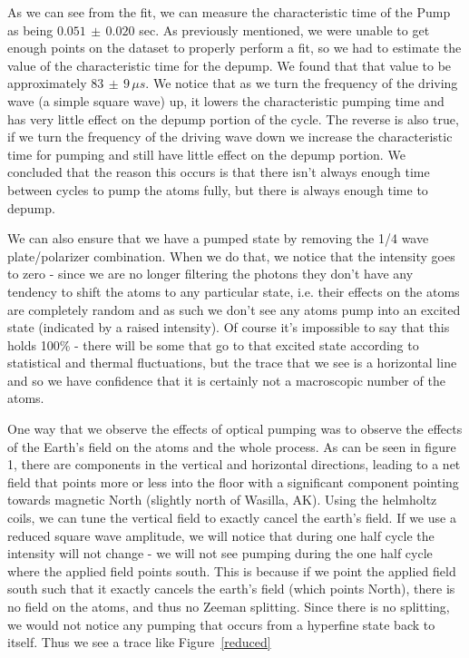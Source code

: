 \documentclass{article}
\begin{document}
    As we can see from the fit, we can measure the characteristic time of the Pump as being $0.051 \, \pm \, 0.020$ sec.  As previously mentioned, we were unable to get enough points on the dataset to properly perform a fit, so we had to estimate the value of the characteristic time for the depump.  We found that that value to be approximately $83 \, \pm \, 9 \, \mu s$.  We notice that as we turn the frequency of the driving wave (a simple square wave) up, it lowers the characteristic pumping time and has very little effect on the depump portion of the cycle.  The reverse is also true, if we turn the frequency of the driving wave down we increase the characteristic time for pumping and still have little effect on the depump portion.  We concluded that the reason this occurs is that there isn't always enough time between cycles to pump the atoms fully, but there is always enough time to depump.

    \hspace{.25cm}

    We can also ensure that we have a pumped state by removing the 1/4 wave plate/polarizer combination.  When we do that, we notice that the intensity goes to zero - since we are no longer filtering the photons they don't have any tendency to shift the atoms to any particular state, i.e. their effects on the atoms are completely random and as such we don't see any atoms pump into an excited state (indicated by a raised intensity).  Of course it's impossible to say that this holds 100\% - there will be some that go to that excited state according to statistical and thermal fluctuations, but the trace that we see is a horizontal line and so we have confidence that it is certainly not a macroscopic number of the atoms.

    \hspace{.25cm}

    One way that we observe the effects of optical pumping was to observe the effects of the Earth's field on the atoms and the whole process.  As can be seen in figure 1, there are components in the vertical and horizontal directions, leading to a net field that points more or less into the floor with a significant component pointing towards magnetic North (slightly north of Wasilla, AK).  Using the helmholtz coils, we can tune the vertical field to exactly cancel the earth's field.  If we use a reduced square wave amplitude, we will notice that during one half cycle the intensity will not change - we will not see pumping during the one half cycle where the applied field points south.  This is because if we point the applied field south such that it exactly cancels the earth's field (which points North), there is no field on the atoms, and thus no Zeeman splitting.  Since there is no splitting, we would not notice any pumping that occurs from a hyperfine state back to itself.  Thus we see a trace like Figure~\ref{reduced}
\end{document}
